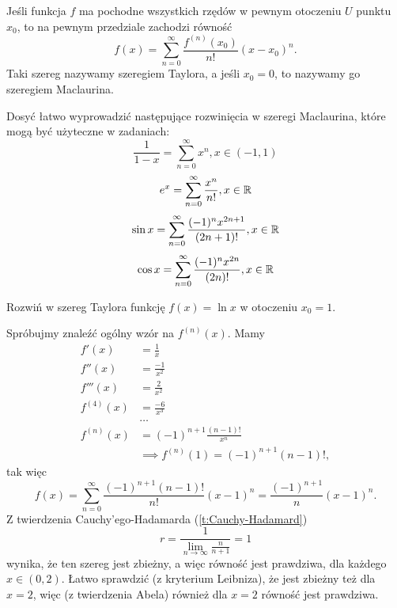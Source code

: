 \begin{theorem}
    Jeśli funkcja $f$ ma pochodne wszystkich rzędów w pewnym otoczeniu $U$ punktu $x_0$, to na pewnym przedziale zachodzi równość
    \[ f(x) = \sum_{n=0}^\infty \frac{f^{(n)}(x_0)}{n!}(x - x_0)^n. \]
    Taki szereg nazywamy szeregiem Taylora, a jeśli $x_0 = 0$, to nazywamy go szeregiem Maclaurina.
\end{theorem}

\begin{fact}
    Dosyć łatwo wyprowadzić następujące rozwinięcia w szeregi Maclaurina, które mogą być użyteczne w zadaniach:
    \[ \frac{1}{1 - x} = \sum_{n=0}^\infty x^n, x \in (-1, 1) \]
    \[ e^x = \sum_{n=0}^\infty \frac{x^n}{n!}, x \in \mathbb R \]
    \[ \sin{x} = \sum_{n=0}^\infty \frac{(-1)^n x^{2n+1}}{(2n+1)!}, x \in \mathbb R \]
    \[ \cos{x} = \sum_{n=0}^\infty \frac{(-1)^n x^{2n}}{(2n)!}, x \in \mathbb R \]
\end{fact}

\begin{example}
    Rozwiń w szereg Taylora funkcję $f(x) = \ln{x}$ w otoczeniu $x_0 = 1$.
\end{example}
\begin{solution}
    Spróbujmy znaleźć ogólny wzór na $f^{(n)}(x)$. Mamy
    \begin{align*}
        f'(x) &= \frac{1}{x} \\
        f''(x) &= \frac{-1}{x^2} \\
        f'''(x) &= \frac{2}{x^2} \\
        f^{(4)}(x) &= \frac{-6}{x^3} \\
        &\ldots \\
        f^{(n)}(x) &= (-1)^{n+1}\frac{(n-1)!}{x^n} \\
        &\implies f^{(n)}(1) = (-1)^{n+1}(n-1)!,
    \end{align*}
    tak więc
    \[ f(x) = \sum_{n=0}^\infty \frac{(-1)^{n+1}(n-1)!}{n!}(x-1)^n = \frac{(-1)^{n+1}}{n}(x-1)^n. \]
    Z twierdzenia Cauchy'ego-Hadamarda (\ref{t:Cauchy-Hadamard})
    \[ r = \frac{1}{\lim\limits_{n\to\infty}\frac{n}{n+1}} = 1 \]
    wynika, że ten szereg jest zbieżny, a więc równość jest prawdziwa, dla każdego $x \in (0, 2)$. Łatwo sprawdzić (z kryterium Leibniza), że jest zbieżny też dla $x = 2$, więc (z twierdzenia Abela) również dla $x = 2$ równość jest prawdziwa.
\end{solution}

